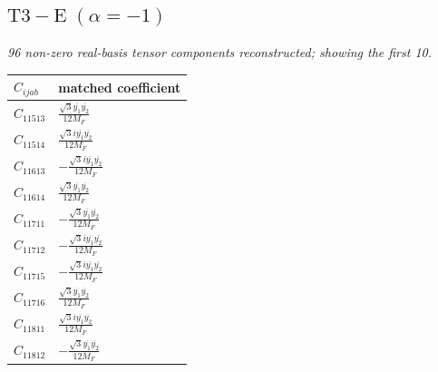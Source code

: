 \documentclass[9pt]{article}
\begin{document}
\subsection*{$ \mathrm{T3-E}\;(\alpha=-1) $}
\textit{96 non-zero real-basis tensor components reconstructed; showing the first 10.}
\begin{longtable}{@{}ll@{}}
\toprule
$C_{ijab}$ & matched coefficient \\
\midrule
$C_{11513}$ & $ \frac{\sqrt{3} \overline{y_{1}} \overline{y_{2}}}{12 M_F} $ \\
$C_{11514}$ & $ \frac{\sqrt{3} i \overline{y_{1}} \overline{y_{2}}}{12 M_F} $ \\
$C_{11613}$ & $ - \frac{\sqrt{3} i \overline{y_{1}} \overline{y_{2}}}{12 M_F} $ \\
$C_{11614}$ & $ \frac{\sqrt{3} \overline{y_{1}} \overline{y_{2}}}{12 M_F} $ \\
$C_{11711}$ & $ - \frac{\sqrt{3} \overline{y_{1}} \overline{y_{2}}}{12 M_F} $ \\
$C_{11712}$ & $ - \frac{\sqrt{3} i \overline{y_{1}} \overline{y_{2}}}{12 M_F} $ \\
$C_{11715}$ & $ - \frac{\sqrt{3} i \overline{y_{1}} \overline{y_{2}}}{12 M_F} $ \\
$C_{11716}$ & $ \frac{\sqrt{3} \overline{y_{1}} \overline{y_{2}}}{12 M_F} $ \\
$C_{11811}$ & $ \frac{\sqrt{3} i \overline{y_{1}} \overline{y_{2}}}{12 M_F} $ \\
$C_{11812}$ & $ - \frac{\sqrt{3} \overline{y_{1}} \overline{y_{2}}}{12 M_F} $ \\
\bottomrule
\end{longtable}
\end{document}
